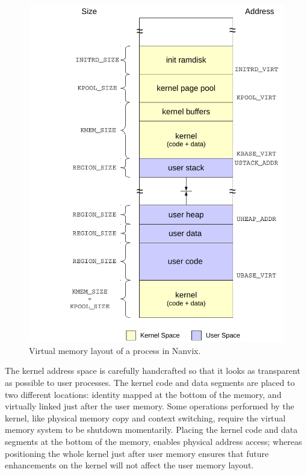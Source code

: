 	\begin{figure}[!b]
		\centering
		\includegraphics[scale=0.60]{img/memory-layout}
		\caption{Virtual memory layout of a process in Nanvix.}
		\label{figure: virtual memory layout}
	\end{figure}

	The kernel address space is carefully handcrafted so that it looks
	as transparent as possible to user processes. The kernel code and
	data segments are placed to two different locations: identity mapped
	at the bottom of the memory, and virtually linked just after the
	user memory. Some operations performed by the kernel, like physical
	memory copy and context switching, require the virtual memory system
	to be shutdown momentarily. Placing the kernel code and data
	segments at the bottom of the memory, enables physical address
	access; whereas positioning the whole kernel just after user memory
	ensures that future enhancements on the kernel will not affect the
	user memory layout.

